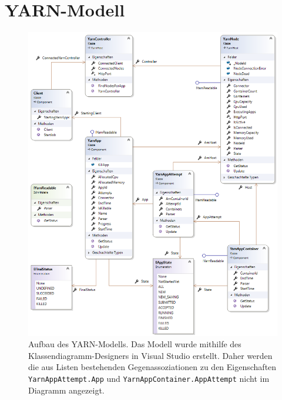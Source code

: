 \section{YARN-Modell}\label{sec:yarnModel}

\begin{figure}
	\centering
	\includegraphics[width=\columnwidth]{./images/yarnModel.png}
	\caption[Aufbau des YARN-Modells]{Aufbau des YARN-Modells. Das Modell wurde mithilfe des Klassendiagramm-Designers in Visual Studio erstellt. Daher werden die aus Listen bestehenden Gegenassoziationen zu den Eigenschaften \texttt{YarnAppAttempt.App} und \texttt{YarnAppContainer.AppAttempt} nicht im Diagramm angezeigt.}
	\label{fig:yarnModel}
\end{figure}